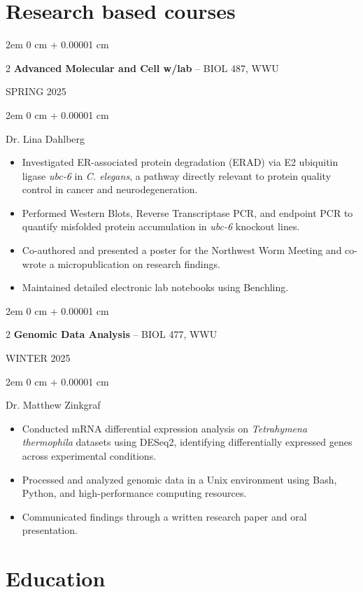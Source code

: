 \documentclass[11pt]{article}
\newcommand{\secrule}{\ \raisebox{0.5ex}{\hrulefill}}
\newcommand{\experience}[2]{%
  \begin{twocolentry}{\MakeUppercase{#2}}%
    {\fontsize{11.5pt}{13.5pt}\selectfont #1}%
  \end{twocolentry}%
}
\newenvironment{highlights}{
    \begin{itemize}[
        topsep=0.10 cm,
        parsep=0.10 cm,
        partopsep=0pt,
        itemsep=0pt,
        leftmargin=0 cm + 10pt
    ]
}{
    \end{itemize}
} %
\newenvironment{onecolentry}{
    \begin{adjustwidth}{
        2em
    }{
        0 cm + 0.00001 cm
    }
}{
    \end{adjustwidth}
} %
\newenvironment{twocolentry}[2][]{
    \onecolentry
    \def\secondColumn{#2}
    \setcolumnwidth{\fill, 5.5 cm}
    \begin{paracol}{2}
}{
    \switchcolumn \raggedleft \secondColumn
    \end{paracol}
    \endonecolentry
} %
\begin{document}
\section{Research based courses}
\experience{\textbf{Advanced Molecular and Cell w/lab} -- BIOL 487, WWU}{Spring 2025}


\begin{onecolentry}
	Dr. Lina Dahlberg
	\begin{highlights}
		\item Investigated ER-associated protein degradation (ERAD) via E2 ubiquitin ligase \textit{ubc-6} in \textit{C. elegans}, a pathway directly relevant to protein quality control in cancer and neurodegeneration.
		\item Performed Western Blots, Reverse Transcriptase PCR, and endpoint PCR to quantify misfolded protein accumulation in \textit{ubc-6} knockout lines.
		\item Co-authored and presented a poster for the Northwest Worm Meeting and co-wrote a micropublication on research findings.
		\item Maintained detailed electronic lab notebooks using Benchling.
	\end{highlights}
\end{onecolentry}


\experience{\textbf{Genomic Data Analysis} -- BIOL 477, WWU}{Winter 2025}

\begin{onecolentry}
	Dr. Matthew Zinkgraf
	\begin{highlights}
		\item Conducted mRNA differential expression analysis on \textit{Tetrahymena thermophila} datasets using DESeq2, identifying differentially expressed genes across experimental conditions.
		\item Processed and analyzed genomic data in a Unix environment using Bash, Python, and high-performance computing resources.
		\item Communicated findings through a written research paper and oral presentation.
	\end{highlights}
\end{onecolentry}

	\section{Education\secrule}
\end{document}
